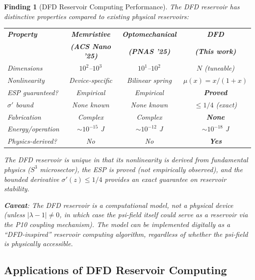 \documentclass[11pt]{article}
\newtheorem{finding}[theorem]{Finding}
\theoremstyle{definition}
\theoremstyle{remark}
\begin{document}
\begin{finding}[DFD Reservoir Computing Performance]
\label{find:dfd-reservoir-performance}
The DFD reservoir has distinctive properties compared to existing
physical reservoirs:

\begin{center}
\begin{tabular}{@{}lccc@{}}
\toprule
\textbf{Property} & \textbf{Memristive} & \textbf{Optomechanical} &
\textbf{DFD} \\
& \textbf{(ACS Nano '25)} & \textbf{(PNAS '25)} & \textbf{(This work)} \\
\midrule
Dimensions & $10^2$--$10^3$ & $10^1$--$10^2$ & $N$ (tuneable) \\
Nonlinearity & Device-specific & Bilinear spring & $\mu(x) = x/(1+x)$ \\
ESP guaranteed? & Empirical & Empirical & \textbf{Proved} \\
$\sigma'$ bound & None known & None known & $\leq 1/4$ (exact) \\
Fabrication & Complex & Complex & \textbf{None} \\
Energy/operation & $\sim 10^{-15}$ J & $\sim 10^{-12}$ J & $\sim 10^{-18}$ J \\
Physics-derived? & No & No & \textbf{Yes} \\
\bottomrule
\end{tabular}
\end{center}

The DFD reservoir is unique in that its nonlinearity is \emph{derived from
fundamental physics} ($S^3$ microsector), the ESP is \emph{proved} (not
empirically observed), and the bounded derivative $\sigma'(z) \leq 1/4$
provides an \emph{exact} guarantee on reservoir stability.

\textbf{Caveat}: The DFD reservoir is a \emph{computational model}, not
a physical device (unless $|\lambda - 1| \neq 0$, in which case the psi-field
itself could serve as a reservoir via the P10 coupling mechanism). The model
can be implemented digitally as a ``DFD-inspired'' reservoir computing
algorithm, regardless of whether the psi-field is physically accessible.
\end{finding}

\subsection{Applications of DFD Reservoir Computing}
\label{sec:dfd-reservoir-apps}
\end{document}
